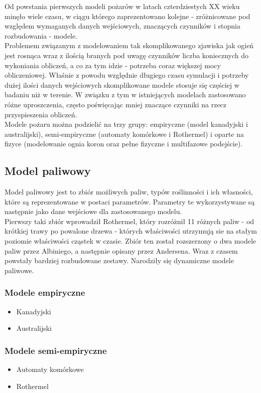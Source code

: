 \documentclass[a4paper, 11pt]{article}
\begin{document}
	Od powstania pierwszych modeli pożarów w latach czterdziestych XX wieku minęło wiele czasu, w ciągu którego zaprezentowano kolejne - zróżnicowane pod względem wymaganych danych wejściowych, znaczących czynników i stopnia rozbudowania - modele.\\
	\indent	Problemem związanym z modelowaniem tak skomplikowanego zjawiska jak ogień jest rosnąca wraz z ilością branych pod uwagę czynników liczba koniecznych do wykoniania obliczeń, a co za tym idzie - potrzeba coraz większej mocy obliczeniowej. Właśnie  z powodu względnie długiego czasu symulacji i potrzeby dużej ilości danych wejściowych skomplikowane modele stosuje się częściej w badaniu niż w terenie.  W związku z tym w istniejących modelach zastosowano różne uproszczenia, często poświęcając mniej znaczące czynniki na rzecz przyspieszenia obliczeń.  \\
	\indent	Modele pożaru można podzielić na trzy grupy: empiryczne (model kanadyjski i australijski), semi-empiryczne (automaty komórkowe i Rothermel) i oparte na fizyce (modelowanie ognia koron oraz pełne fizyczne i multifazowe podejście).
	\subsection{Model paliwowy}	
	\indent
	
	Model paliwowy jest to zbiór możliwych paliw, typów roślinności i ich własności, które są reprezentowane w postaci parametrów. Parametry te wykorzystywane są następnie jako dane wejściowe dla zastosowanego modelu.\\
	
	Pierwszy taki zbiór wprowadził Rothermel, który rozróżnił 11 różnych paliw - od  krótkiej trawy po powalone drzewa - których właściwości utrzymują sie na stałym poziomie właściwości cząstek w czasie. Zbiór ten został rozszerzony o dwa modele paliw przez Albiniego, a następnie opisany przez Andersena. Wraz z czasem powstały bardziej rozbudowane zestawy. Narodziły się dynamiczne modele paliwowe. 
	
	\iffalse
	\subsubsection*{Modele empiryczne}
	\begin{itemize}
		\item Kanadyjski
		\item Australijski
	\end{itemize}
	\subsubsection*{Modele semi-empiryczne}
	\begin{itemize}
		\item Automaty komórkowe
		\item Rothermel
	\end{itemize}
\end{document}
